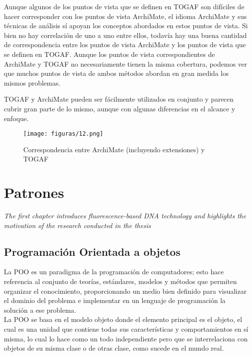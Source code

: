    Aunque algunos de los puntos de vista que se definen en TOGAF son difíciles de hacer corresponder con los puntos de vista ArchiMate, el idioma ArchiMate y sus técnicas de análisis sí apoyan los conceptos abordados en estos puntos de vista. Si bien no hay correlación de uno a uno entre ellos, todavía hay una buena cantidad de correspondencia entre los puntos de vista ArchiMate y los puntos de vista que se definen en TOGAF. Aunque los puntos de vista correspondientes de ArchiMate y TOGAF no necesariamente tienen la misma cobertura, podemos ver que muchos puntos de vista de ambos métodos abordan en gran medida los mismos problemas.
   
   TOGAF y ArchiMate pueden ser fácilmente utilizados en conjunto y parecen cubrir gran parte de lo mismo, aunque con algunas diferencias en el alcance y enfoque.
   
     \begin{figure}[!h]
     	\centering
     	\texttt{[image: figuras/12.png]}
     	\captionsetup{width=.95\textwidth}
     	\caption{Correspondencia entre ArchiMate (incluyendo extensiones) y TOGAF}
     	\label{figura12}
     \end{figure}

\chapter{Patrones}
\label{chap:patrones}
\textit{The first chapter introduces fluorescence-based DNA technology and highlights the motivation of the research conducted in the thesis}
\vfill
\minitoc
\newpage

\section{Programación Orientada a objetos}
La POO es un paradigma de la programación de computadores; esto hace referencia al conjunto de teorías, estándares, modelos y métodos que permiten organizar el conocimiento, proporcionando un medio bien definido para visualizar el dominio del problema e implementar en un lenguaje de programación la solución a ese problema. \\

La POO se basa en el modelo objeto donde el elemento principal es el objeto, el cual es una unidad que contiene todas sus características y comportamientos en sí misma, lo cual lo hace como un todo independiente pero que se interrelaciona con objetos de su misma clase o de otras clase, como sucede en el mundo real. \\

